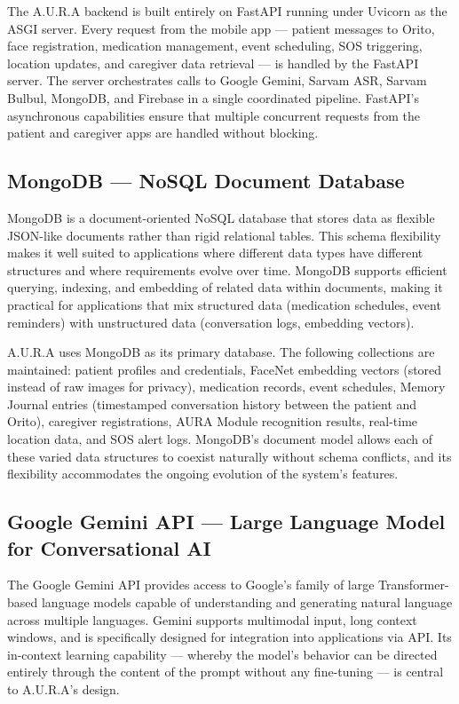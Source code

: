 The A.U.R.A backend is built entirely on FastAPI running under Uvicorn as the ASGI server. Every request from the mobile app --- patient messages to Orito, face registration, medication management, event scheduling, SOS triggering, location updates, and caregiver data retrieval --- is handled by the FastAPI server. The server orchestrates calls to Google Gemini, Sarvam ASR, Sarvam Bulbul, MongoDB, and Firebase in a single coordinated pipeline. FastAPI's asynchronous capabilities ensure that multiple concurrent requests from the patient and caregiver apps are handled without blocking.

\subsection{MongoDB --- NoSQL Document Database}
MongoDB is a document-oriented NoSQL database that stores data as flexible JSON-like documents rather than rigid relational tables. This schema flexibility makes it well suited to applications where different data types have different structures and where requirements evolve over time. MongoDB supports efficient querying, indexing, and embedding of related data within documents, making it practical for applications that mix structured data (medication schedules, event reminders) with unstructured data (conversation logs, embedding vectors).

A.U.R.A uses MongoDB as its primary database. The following collections are maintained: patient profiles and credentials, FaceNet embedding vectors (stored instead of raw images for privacy), medication records, event schedules, Memory Journal entries (timestamped conversation history between the patient and Orito), caregiver registrations, AURA Module recognition results, real-time location data, and SOS alert logs. MongoDB's document model allows each of these varied data structures to coexist naturally without schema conflicts, and its flexibility accommodates the ongoing evolution of the system's features.

\subsection{Google Gemini API --- Large Language Model for Conversational AI}
The Google Gemini API provides access to Google's family of large Transformer-based language models capable of understanding and generating natural language across multiple languages. Gemini supports multimodal input, long context windows, and is specifically designed for integration into applications via API. Its in-context learning capability --- whereby the model's behavior can be directed entirely through the content of the prompt without any fine-tuning --- is central to A.U.R.A's design.

